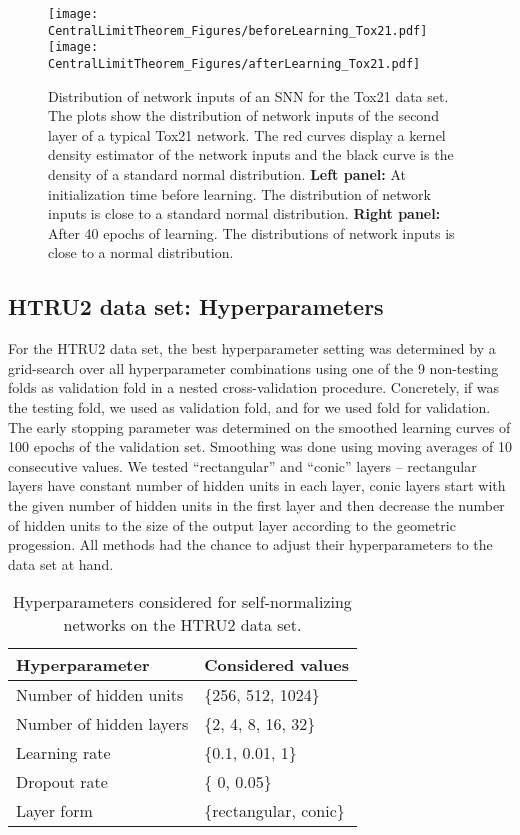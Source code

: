 \documentclass{article}
\begin{document}
\begin{figure}
 \texttt{[image: CentralLimitTheorem\_Figures/beforeLearning\_Tox21.pdf]}
 \texttt{[image: CentralLimitTheorem\_Figures/afterLearning\_Tox21.pdf]}
 \caption[Distribution of network inputs in Tox21 SNNs.]{Distribution of network inputs of an SNN for the Tox21 data set. 
  The plots show the distribution of network inputs  of the second layer of a typical Tox21 network.
  The red curves display a kernel density estimator of the network inputs and the black curve is the 
  density of a standard normal distribution. 
  {\bf Left panel:} At initialization time before learning. The distribution of network inputs is close to a standard 
  normal distribution.
  {\bf Right panel:} After 40 epochs of learning. The distributions of network inputs is close to a normal distribution.
  \label{fig:clt}
 }
\end{figure}




\clearpage

\subsection{HTRU2 data set: Hyperparameters}
For the HTRU2 data set, the best hyperparameter setting was determined by a grid-search over all
hyperparameter combinations using one of the 9 non-testing folds as validation fold in a nested
cross-validation procedure. Concretely, 
if  was the testing fold, we used  as validation fold, and for  we used fold 
for validation. The early stopping parameter was determined on the smoothed learning curves of 100 epochs 
of the validation set. Smoothing was done using moving averages of 10 consecutive 
values. We tested ``rectangular'' and ``conic'' layers -- rectangular layers have 
constant number of hidden units in each layer, conic layers start with the given 
number of hidden units in the first layer and then decrease the number of hidden units
to the size of the output layer according to the geometric progession.
All methods had the chance to adjust their hyperparameters to the data set at hand. 

\begin{table}[htp]
\begin{center}
\caption{Hyperparameters considered for self-normalizing networks on the HTRU2 data set.}
\begin{tabular}{ll}
\toprule
Hyperparameter  & Considered values \\ 
\midrule
  Number of hidden units & \{256, 512, 1024\} \\
  Number of hidden layers & \{2, 4, 8, 16, 32\} \\
  Learning rate & \{0.1, 0.01, 1\} \\
  Dropout rate & \{ 0, 0.05\}\\
  Layer form & \{rectangular, conic\} \\
\bottomrule
\end{tabular}
\end{center}
\end{table}
\end{document}
